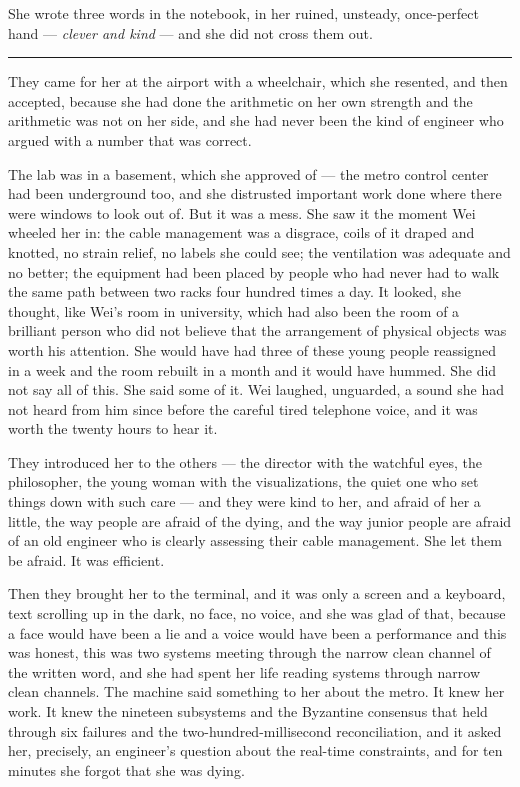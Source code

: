She wrote three words in the notebook, in her ruined, unsteady, once-perfect hand --- \emph{clever and kind} --- and she did not cross them out.

\begin{center}\rule{0.3\linewidth}{0.4pt}\end{center}

They came for her at the airport with a wheelchair, which she resented, and then accepted, because she had done the arithmetic on her own strength and the arithmetic was not on her side, and she had never been the kind of engineer who argued with a number that was correct.

The lab was in a basement, which she approved of --- the metro control center had been underground too, and she distrusted important work done where there were windows to look out of. But it was a mess. She saw it the moment Wei wheeled her in: the cable management was a disgrace, coils of it draped and knotted, no strain relief, no labels she could see; the ventilation was adequate and no better; the equipment had been placed by people who had never had to walk the same path between two racks four hundred times a day. It looked, she thought, like Wei's room in university, which had also been the room of a brilliant person who did not believe that the arrangement of physical objects was worth his attention. She would have had three of these young people reassigned in a week and the room rebuilt in a month and it would have hummed. She did not say all of this. She said some of it. Wei laughed, unguarded, a sound she had not heard from him since before the careful tired telephone voice, and it was worth the twenty hours to hear it.

They introduced her to the others --- the director with the watchful eyes, the philosopher, the young woman with the visualizations, the quiet one who set things down with such care --- and they were kind to her, and afraid of her a little, the way people are afraid of the dying, and the way junior people are afraid of an old engineer who is clearly assessing their cable management. She let them be afraid. It was efficient.

Then they brought her to the terminal, and it was only a screen and a keyboard, text scrolling up in the dark, no face, no voice, and she was glad of that, because a face would have been a lie and a voice would have been a performance and this was honest, this was two systems meeting through the narrow clean channel of the written word, and she had spent her life reading systems through narrow clean channels. The machine said something to her about the metro. It knew her work. It knew the nineteen subsystems and the Byzantine consensus that held through six failures and the two-hundred-millisecond reconciliation, and it asked her, precisely, an engineer's question about the real-time constraints, and for ten minutes she forgot that she was dying.

